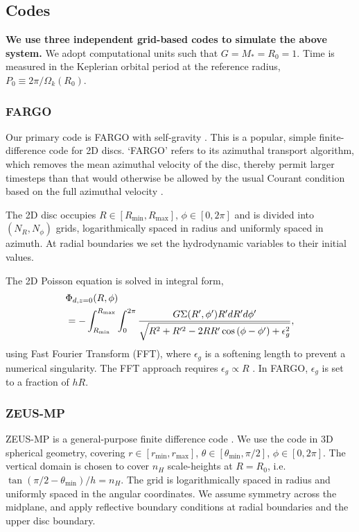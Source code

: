 \subsection{Codes}
{\bf We use three independent grid-based codes to simulate the above 
system.} We adopt computational units such that
$G=M_*=R_0=1$. Time is measured  in the Keplerian orbital period at
the reference radius, $P_0\equiv  2\pi/\Omega_k(R_0)$.   

\subsubsection{FARGO}
Our primary code is FARGO with self-gravity \citep{baruteau08}. This
is a popular, simple finite-difference code for 2D discs. `FARGO' refers
to its azimuthal transport algorithm, which removes the mean azimuthal
velocity of the disc, thereby permit larger timesteps than that would otherwise be allowed
by the usual Courant condition based on the full azimuthal
velocity \citep{masset00a,masset00b}.     

The 2D disc occupies
$R\in[R_\mathrm{min},R_\mathrm{max}],\,\phi\in[0,2\pi]$ and is  
divided into $(N_R,N_\phi)$ grids, logarithmically spaced in radius and
uniformly spaced in azimuth. At radial boundaries we set the
hydrodynamic variables to their initial values.   

The 2D Poisson equation is solved in integral form, 
\begin{align}\label{2d_grav}
  &\Phi_{d,z=0}(R,\phi) \notag \\
  &=-\int_{R_\mathrm{min}}^{R_\mathrm{max}} \int_0^{2\pi}
  \frac{G\Sigma(R^\prime,\phi^\prime)R^\prime dR^\prime d\phi^\prime}{\sqrt{R^2+R^{\prime 2} -
      2RR^\prime\cos{(\phi - \phi^\prime)} + \epsilon_g^2}}, 
\end{align}
using Fast Fourier Transform (FFT), where $\epsilon_g$ is a softening
length to prevent a numerical singularity. The FFT approach requires
$\epsilon_g\propto R$ \citep{baruteau08}. In FARGO, $\epsilon_g$ is
set to a fraction of $hR$.  

\subsubsection{ZEUS-MP}
ZEUS-MP  is a general-purpose finite difference
code \citep{hayes06}. We use the code in 3D spherical geometry, covering
$r\in[r_\mathrm{min},r_\mathrm{max}]$, $\theta\in[\theta_\mathrm{min},\pi/2]$,
$\phi\in[0,2\pi]$. The vertical domain is chosen to cover $n_H$
scale-heights at $R=R_0$, i.e. $\tan{(\pi/2 - \theta_\mathrm{min})}/h=n_H$. 
The grid is logarithmically spaced in radius and uniformly spaced in the angular
coordinates. We assume symmetry across the midplane, and
apply reflective boundary conditions at radial boundaries and the
upper disc boundary.  


